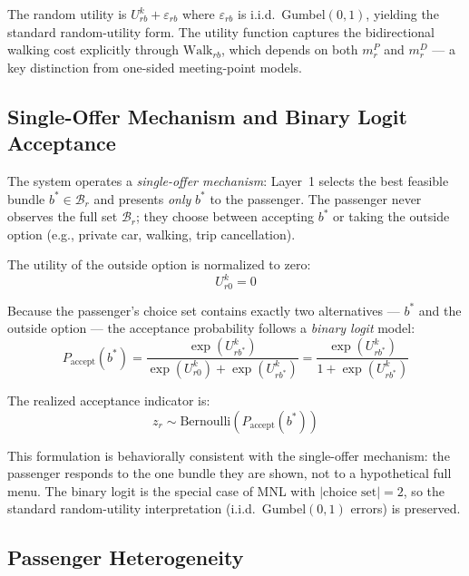 The random utility is $U_{rb}^k + \varepsilon_{rb}$ where $\varepsilon_{rb}$ is i.i.d.\
Gumbel$(0,1)$, yielding the standard random-utility form. The utility function captures the
bidirectional walking cost explicitly through $\text{Walk}_{rb}$, which depends on both
$m_r^P$ and $m_r^D$ --- a key distinction from one-sided meeting-point models.

\subsection{Single-Offer Mechanism and Binary Logit Acceptance}

The system operates a \emph{single-offer mechanism}: Layer~1 selects the best feasible
bundle $b^* \in \mathcal{B}_r$ and presents \emph{only} $b^*$ to the passenger. The
passenger never observes the full set $\mathcal{B}_r$; they choose between accepting $b^*$
or taking the outside option (e.g., private car, walking, trip cancellation).

The utility of the outside option is normalized to zero:
\begin{equation}\label{eq:utility-outside}
  U_{r0}^k = 0
\end{equation}

Because the passenger's choice set contains exactly two alternatives --- $b^*$ and the
outside option --- the acceptance probability follows a \emph{binary logit} model:
\begin{equation}\label{eq:binary-logit}
  P_{\text{accept}}(b^*) = \frac{\exp(U_{rb^*}^k)}{\exp(U_{r0}^k) + \exp(U_{rb^*}^k)}
                         = \frac{\exp(U_{rb^*}^k)}{1 + \exp(U_{rb^*}^k)}
\end{equation}

The realized acceptance indicator is:
\begin{equation}\label{eq:acceptance-indicator}
  z_r \sim \text{Bernoulli}\!\left(P_{\text{accept}}(b^*)\right)
\end{equation}

This formulation is behaviorally consistent with the single-offer mechanism: the passenger
responds to the one bundle they are shown, not to a hypothetical full menu. The binary
logit is the special case of MNL with $|\text{choice set}| = 2$, so the standard
random-utility interpretation (i.i.d.\ Gumbel$(0,1)$ errors) is preserved.

\subsection{Passenger Heterogeneity}

